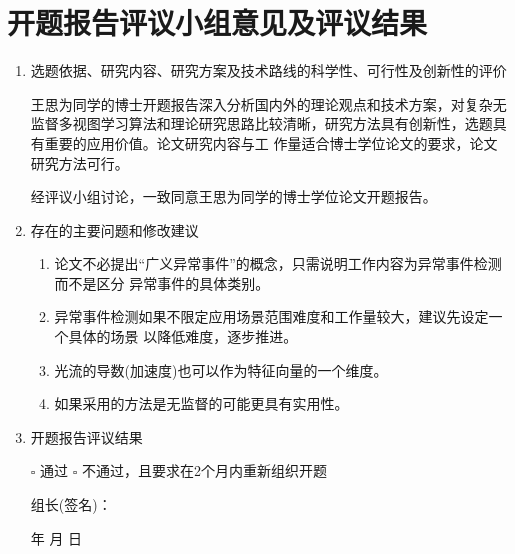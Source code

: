 

\section{开题报告评议小组意见及评议结果}
\begin{mdframed}[everyline=true]

\begin{enumerate}[label={(\arabic*)},labelsep= 3 pt]
	\item {\songti 选题依据、研究内容、研究方案及技术路线的科学性、可行性及创新性的评价}
	
	\quad\quad  王思为同学的博士开题报告深入分析国内外的理论观点和技术方案，对复杂无监督多视图学习算法和理论研究思路比较清晰，研究方法具有创新性，选题具有重要的应用价值。论文研究内容与工 作量适合博士学位论文的要求，论文研究方法可行。
	
	经评议小组讨论，一致同意王思为同学的博士学位论文开题报告。
	
	\item  {\songti 存在的主要问题和修改建议 }
	\begin{enumerate}[label={\arabic*)},labelsep=3 pt]
		\item 论文不必提出“广义异常事件”的概念，只需说明工作内容为异常事件检测而不是区分 异常事件的具体类别。
		\item 异常事件检测如果不限定应用场景范围难度和工作量较大，建议先设定一个具体的场景 以降低难度，逐步推进。
		\item 光流的导数(加速度)也可以作为特征向量的一个维度。
		\item 如果采用的方法是无监督的可能更具有实用性。
	\end{enumerate}

	\item  {\songti 开题报告评议结果}
	
    $\square$  {\songti 通过} \quad\quad \quad \quad  $\square$ {\songti 不通过，且要求在2个月内重新组织开题}
	\\[20pt]
	
	
	{  \songti
	\quad\quad\quad\quad \quad\quad\quad\quad 	\quad\quad\quad\quad \quad\quad\quad\quad 组长(签名)：
	
	\quad\quad\quad\quad \quad\quad\quad\quad 	\quad\quad\quad\quad \quad\quad\quad\quad \quad\quad\quad 年  \quad\quad 月  \quad\quad 日
	\\
    }
\end{enumerate}
\end{mdframed}
